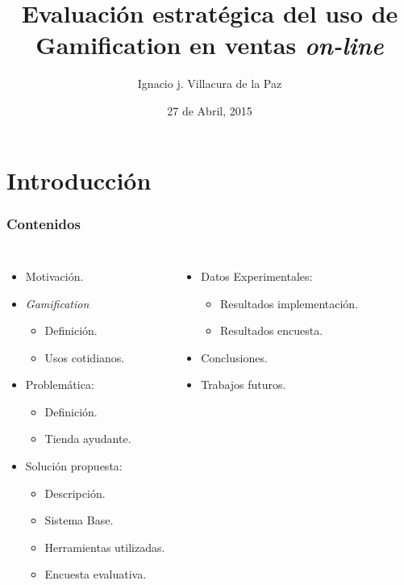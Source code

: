 \documentclass[10pt, compress]{beamer}
\title{Evaluación estratégica del uso de Gamification en ventas \emph{on-line}}
\subtitle{}
\date{27 de Abril, 2015}
\author{Ignacio j. Villacura de la Paz}
\institute{Departamento de Informática\\ Universidad Técnica Federico Santa María}
\begin{document}
\maketitle

\section{Introducción}

\begin{frame}[fragile]
  \frametitle{Contenidos}

\begin{columns}[onlytextwidth]
  \begin{itemize}[<+- | alert@+>]
    \item Motivación.
    \item \emph{Gamification}
	\begin{itemize}[<+- | alert@+>]
	  \item Definición.
	  \item Usos cotidianos.
	\end{itemize}
    \item Problemática:
	\begin{itemize}[<+- | alert@+>]
          \item Definición.
          \item Tienda ayudante.
        \end{itemize}
    \item Solución propuesta:
	\begin{itemize}[<+- | alert@+>]
          \item Descripción.
          \item Sistema Base.
	  \item Herramientas utilizadas.
	  \item Encuesta evaluativa.
        \end{itemize}
\end{itemize}

  \begin{itemize}[<+- | alert@+>]
    \item Datos Experimentales:
	\begin{itemize}[<+- | alert@+>]
          \item Resultados implementación.
          \item Resultados encuesta.
        \end{itemize}
    \item Conclusiones.
    \item Trabajos futuros.
  \end{itemize}
\end{columns}
\end{frame}
\end{document}
